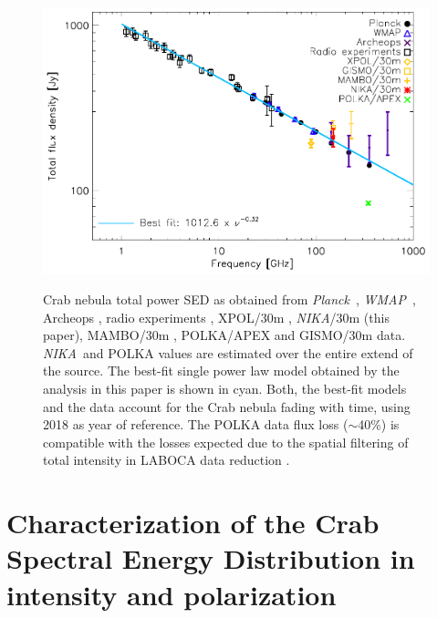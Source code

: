\documentclass[twocolumn,traditabstract]{aa}
\def\NIKA{\textit{NIKA}}
\def\Planck{\textit{Planck}}
\def\WMAP{\textit{WMAP}}
\begin{document}
\begin{figure}
  \centering
          { \includegraphics[width=1\linewidth,keepaspectratio]{figures/Crab_SED_int_test.pdf}}
           \caption{Crab nebula total power SED as obtained from \Planck\ \citep{2015arXiv150702058P}, \WMAP\ \citep{2011ApJS..192...19W}, Archeops \citep{macias2007archeops}, radio experiments \citep{dmitrenko1970absolute, 1971IzVUZ..14..157V}, XPOL/30m \citep{aumont2010}, \NIKA/30m (this paper), MAMBO/30m \citep{2002A&A...386.1044B}, POLKA/APEX \citep{2014PASP..126.1027W} and GISMO/30m \citep{2011ApJ...734...54A} data. \NIKA\ and POLKA values are estimated over the entire extend of the source. The best-fit single power law model obtained by the analysis in this paper is shown in cyan. Both, the best-fit models and the data account for the Crab nebula fading with time, using 2018 as year of reference. The POLKA data flux loss ($\sim$40\%) is compatible with the losses expected due to the spatial filtering of total intensity in LABOCA data reduction \citep{2011A&A...527A.145B}.}
\label{crab_SED}		
  \end{figure} 

\section{Characterization of the Crab Spectral Energy Distribution in intensity and polarization}\label{sec:Polarization intensity Spectral Energy Density (SED)}
\end{document}
